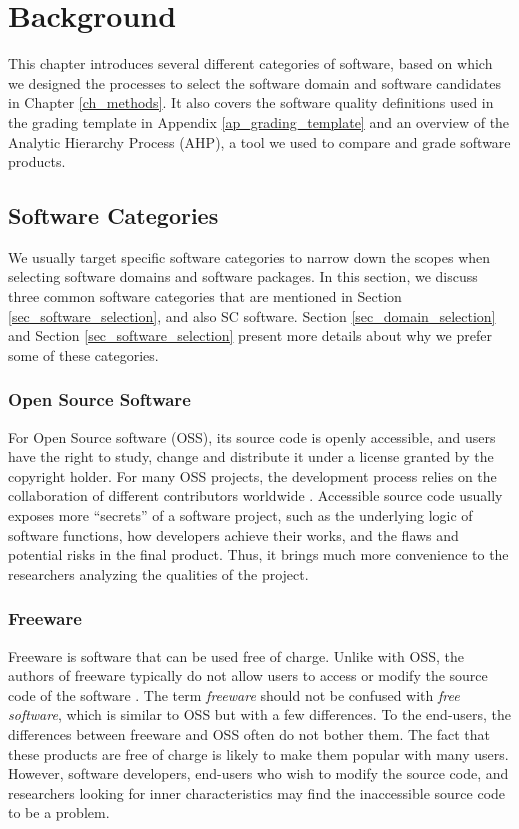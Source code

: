 \chapter{Background}
\label{ch_background}

This chapter introduces several different categories of software, based on which we designed the processes to select the software domain and software candidates in Chapter \ref{ch_methods}. It also covers the software quality definitions used in the grading template in Appendix \ref{ap_grading_template} and an overview of the Analytic Hierarchy Process (AHP), a tool we used to compare and grade software products.

\section{Software Categories}
We usually target specific software categories to narrow down the scopes when selecting software domains and software packages. In this section, we discuss three common software categories that are mentioned in Section \ref{sec_software_selection}, and also SC software. Section \ref{sec_domain_selection} and Section \ref{sec_software_selection} present more details about why we prefer some of these categories.

\subsection{Open Source Software}
\label{sec_open_source_software}
For Open Source software (OSS), its source code is openly accessible, and users have the right to study, change and distribute it under a license granted by the copyright holder. For many OSS projects, the development process relies on the collaboration of different contributors worldwide \cite{Corbly2014}. Accessible source code usually exposes more ``secrets'' of a software project, such as the underlying logic of software functions, how developers achieve their works, and the flaws and potential risks in the final product. Thus, it brings much more convenience to the researchers analyzing the qualities of the project.

\subsection{Freeware}
\label{sec_freeware}
Freeware is software that can be used free of charge. Unlike with OSS, the authors of freeware typically do not allow users to access or modify the source code of the software \cite{LINFO2006}. The term \textit{freeware} should not be confused with \textit{free software}, which is similar to OSS but with a few differences. To the end-users, the differences between freeware and OSS often do not bother them. The fact that these products are free of charge is likely to make them popular with many users. However, software developers, end-users who wish to modify the source code, and researchers looking for inner characteristics may find the inaccessible source code to be a problem. 

